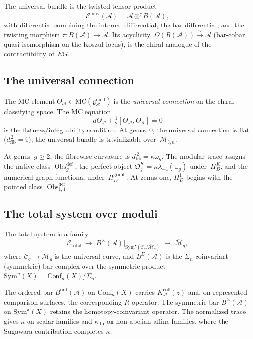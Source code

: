\documentclass[11pt,reqno]{amsart}
\theoremstyle{definition}
\theoremstyle{remark}
\newcommand{\cA}{\mathcal{A}}
\newcommand{\cE}{\mathcal{E}}
\newcommand{\cM}{\mathcal{M}}
\newcommand{\Mbar}{\overline{\mathcal{M}}}
\newcommand{\gmod}{\mathfrak{g}^{\mathrm{mod}}_\cA}
\newcommand{\MC}{\mathrm{MC}}
\newcommand{\Sym}{\mathrm{Sym}}
\newcommand{\Conf}{\mathrm{Conf}}
\newcommand{\dfib}{d_{\mathrm{fib}}}
\numberwithin{equation}{section}
\begin{document}
The universal bundle is the twisted tensor product
\begin{equation}\label{eq:universal-bundle}
\cE^{\mathrm{univ}}(\cA) = \cA \otimes^\tau B(\cA),
\end{equation}
with differential combining the internal differential, the bar
differential, and the twisting morphism
$\tau\colon B(\cA) \to \cA$. Its acyclicity,
$\Omega(B(\cA)) \xrightarrow{\sim} \cA$ (bar-cobar
quasi-isomorphism on the Koszul locus), is the chiral analogue
of the contractibility of~$EG$.

\subsection{The universal connection}

The MC element $\Theta_\cA \in \MC(\gmod)$ is the
\emph{universal connection} on the chiral classifying space.
The MC equation
\begin{equation}\label{eq:mc-eq}
d\Theta_\cA + \tfrac{1}{2}[\Theta_\cA,\Theta_\cA] = 0
\end{equation}
is the flatness/integrability condition. At genus~$0$, the
universal connection is flat ($\dfib^{\,2} = 0$); the
universal bundle is trivializable over~$\cM_{0,n}$.

At genus~$g\geq2$, the fibrewise curvature is
$\dfib^{\,2}=\kappa\omega_g$.  The modular trace assigns the native
class $\operatorname{Obs}^{\mathrm{def}}_g$, the perfect object
$\mathfrak O_g^K=\kappa\lambda_{-1}(\mathbb E_g)$ under~$H_D^K$,
and the numerical graph functional under~$H_D^{\mathrm{graph}}$.
At genus one, $H_D^1$ begins with the pointed class
$\operatorname{Obs}^{\mathrm{def}}_{1,1}$.

\subsection{The total system over moduli}

The total system is a family
\begin{equation}\label{eq:total-system}
\cE_{\mathrm{total}}
\;\longrightarrow\;
B^{\Sigma}(\cA)\big|_{\Sym^\bullet(\mathcal{C}_g/\Mbar_g)}
\;\longrightarrow\;
\Mbar_g,
\end{equation}
where $\mathcal{C}_g \to \Mbar_g$ is the universal curve, and
$B^{\Sigma}(\cA)$ is the $\Sigma_n$-coinvariant (symmetric) bar
complex over the symmetric product
$\Sym^n(X) = \Conf_n(X)/\Sigma_n$.

The ordered bar $B^{\mathrm{ord}}(\cA)$ on $\Conf_n(X)$ carries
$K_\cA^{\mathrm{coll}}(z)$ and, on represented comparison surfaces,
the corresponding $R$-operator. The symmetric bar
$B^{\Sigma}(\cA)$ on $\Sym^n(X)$ retains the homotopy-coinvariant
operator. The normalized trace gives $\kappa$ on scalar families and
$\kappa_{\mathrm{dp}}$ on non-abelian affine families, where the
Sugawara contribution completes $\kappa$.
\end{document}
